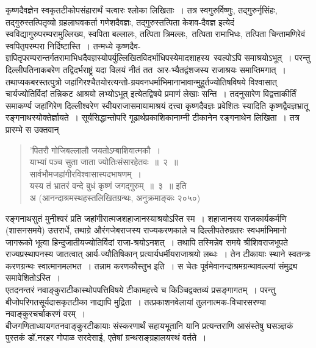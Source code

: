 \documentclass[11pt, openany]{book}
\begin{document}
\newpage

\begin{sloppypar}
कृष्णदैवज्ञेन स्वकृतटीकोपसंहारार्थं चत्वारः श्लोका लिखिताः~। तत्र स्वगुरुर्विष्णुः, तद्गुरुर्नृसिंहः, तद्गुरुस्तत्पितृव्यो ग्रहलाघवकर्ता गणेशदैवज्ञः, तद्गुरुस्तत्पिता केशव-दैवज्ञ इत्येदं स्वविद्यागुरुपरम्परामुल्लिख्य, स्वपिता बल्लालः, तत्पिता त्रिमल्लः,~तत्पिता रामाभिधः, तत्पिता चिन्तामणिरेवं स्वपितृपरम्परा निर्दिष्टास्ति~। तन्मध्ये कृष्णदैव-ज्ञपितृपरम्परान्तर्गतरामाभिधदैवज्ञस्योपर्युल्लिखितविदर्भाधिपस्येमादशाहस्य~स्वल्पोऽपि समाश्रयोऽभूत्~। परन्तु दिल्लीपतिनाकबरेण तद्विदर्भराष्ट्रं यदा विलयं नीतं तत~आर-भ्यैतद्वंशजस्य राजाश्रयः समाप्तिमगात्~। तथाप्यकबरस्तत्पुत्रो जहांगिरश्चैतयोरत्यन्तो-ग्रयवनधर्माभिमानाभावान्मुहूर्तज्योतिषविषये विश्वासात् चार्यज्योतिर्विदां तन्निकट आश्रयो लभ्योऽभूत् इत्येतद्विषये प्रमाणं लेखाः सन्ति~। तदनुसारेण विद्वत्ताकीर्तिं समाकर्ण्य जहांगिरेण दिल्लीश्वरेण स्वीयराजासमायामाश्रयं दत्त्वा कृष्णदैवज्ञः प्रवेशितः स्यादिति कृष्णद्वैवज्ञभ्रातू रङ्गनाथस्योक्तेर्ज्ञायते~। सूर्यसिद्धान्तोपरि गूढार्थप्रकाशिकानाम्नी टीकानेन रङ्गनाथेन लिखिता~। तत्र प्रारम्भे स उक्तवान्\textendash 

\begin{quote}
{\color{violet}'पितरौ गोजिबल्लालौ जयतोऽम्बाशिवात्मकौ~।\\
याभ्यां पञ्च सुता जाता ज्योतिःसंसारहेतवः~॥~२~॥\\
सार्वभौमजहांगीरविश्वासास्पदभाषणम्~।\\
यस्य तं भ्रातरं वन्दे बुधं कृष्णं जगद्गुरुम्~॥~३~॥} इति\\
{\color{white}अ} \hfill (आनन्दाश्रमस्थहस्तलिखितग्रन्थः, अनुक्रमाङ्कः २०५०)
\end{quote}

रङ्गनाथसुतं मुनीश्वरं प्रति जहांगीरात्मजशहाजानस्याश्रयोऽस्ति स्म~। शहाजानस्य राजकार्यकर्मणि (शासनसमये) उत्तरार्धे, तथाग्रे औरंगजेबराजस्य राज्यकरणकाले च दिल्लीपतेरुग्रतरः स्वधर्माभिमानो जागरूको भूत्वा हिन्दुजातीयज्योतिर्विदां राजा-श्रयोऽनशत्~। तथापि तस्मिन्नेव समये श्रीशिवराजभूपते राज्यप्रस्थापनस्य जातत्वात् आर्य-ज्यौतिषिकान् प्रत्यार्यधर्मीयराजाश्रयो लब्धः~। तेन टीकायाः स्थाने स्वतन्त्रः करणग्रन्थः स्वात्मानमलभत~। तन्नाम करणकौस्तुभ इति~। स चेतः पूर्वमेवानन्दाश्रमग्रन्थावल्ल्यां संमुद्र्य समावेशितोऽस्ति~।\\

एतदनन्तरं नवाङ्कुराटीकास्थोपपत्तिविषये टीकामहत्त्वे च किञ्चिद्वक्तव्यं प्रसङ्गागतम्~। परन्तु बीजोपरिगतसूर्यदासकृतटीका नाद्यापि मुद्रिता~। तत्प्रकाशनवेलायां तुलनात्मक-विचारसरण्या नवाङ्कुरचर्चाकरणं वरम्~। \\

बीजगणिताध्यायगतनवाङ्कुरटीकायाः संस्करणार्थं सहायभूतानि यानि प्रत्यन्तराणि आसंस्तेषु घसञ्ज्ञकं पुस्तकं डॉ.\;नरहर गोपाळ सरदेसाई, एतेषां ग्रन्थसङ्ग्रहालयस्थं वर्तते~।
\end{sloppypar}
\end{document}
